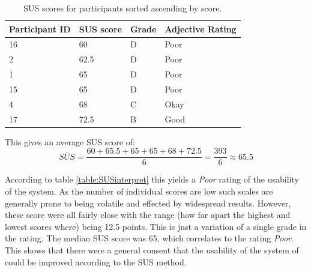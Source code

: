 \begin{table}[H]
\centering
\begin{tabular}{l|l|l|l}
{\textbf{Participant ID}} & { \textbf{SUS score}} & { \textbf{Grade}} & { \textbf{Adjective Rating}}\\ \hline
16   & 60   &  D & Poor                                   \\ 
2   & 62.5 &  D & Poor                                    \\ 
1   & 65 &  D & Poor                                   \\ 
15   & 65 &  D & Poor                                     \\ 
4   & 68 &  C & Okay                                    \\ 
17   & 72.5 &  B & Good                                     \\ 
\end{tabular}
\caption{SUS scores for participants sorted ascending by score.}
\label{table:phase3SUSscores}
\end{table}

This gives an average SUS score of: 
\[\overline{SUS} = \frac{60 + 65.5 + 65 + 65 + 68 + 72.5}{6} = \frac{393}{6} \approx 65.5\]

According to table \ref{table:SUSinterpret} this yields a \textit{Poor} rating of the usability of the system. As the number of individual scores are low such scales are generally prone to being volatile and effected by widespread results. However, these score were all fairly close with the range (how far apart the highest and lowest scores where) being 12.5 points. This is just a variation of a single grade in the rating. The median SUS score was 65, which correlates to the rating \textit{Poor}. This shows that there were a general consent that the usability of the system of could be improved according to the SUS method. 


\cleardoublepage